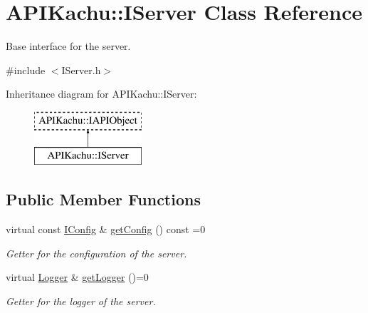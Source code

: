 \hypertarget{class_a_p_i_kachu_1_1_i_server}{}\section{A\+P\+I\+Kachu\+:\+:I\+Server Class Reference}
\label{class_a_p_i_kachu_1_1_i_server}


Base interface for the server.  




{\ttfamily \#include $<$I\+Server.\+h$>$}

Inheritance diagram for A\+P\+I\+Kachu\+:\+:I\+Server\+:\begin{figure}[H]
\begin{center}
\leavevmode
\includegraphics[height=2.000000cm]{class_a_p_i_kachu_1_1_i_server}
\end{center}
\end{figure}
\subsection*{Public Member Functions}
\begin{DoxyCompactItemize}
\item 
virtual const \hyperlink{class_a_p_i_kachu_1_1_i_config}{I\+Config} \& \hyperlink{class_a_p_i_kachu_1_1_i_server_a4a9d8cd045034108f204bf9617103af5}{get\+Config} () const  =0\hypertarget{class_a_p_i_kachu_1_1_i_server_a4a9d8cd045034108f204bf9617103af5}{}\label{class_a_p_i_kachu_1_1_i_server_a4a9d8cd045034108f204bf9617103af5}

\begin{DoxyCompactList}\small\item\em Getter for the configuration of the server. \end{DoxyCompactList}\item 
virtual \hyperlink{class_a_p_i_kachu_1_1_logger}{Logger} \& \hyperlink{class_a_p_i_kachu_1_1_i_server_af7a87851ad77ac1efdacb277ea2bec59}{get\+Logger} ()=0\hypertarget{class_a_p_i_kachu_1_1_i_server_af7a87851ad77ac1efdacb277ea2bec59}{}\label{class_a_p_i_kachu_1_1_i_server_af7a87851ad77ac1efdacb277ea2bec59}

\begin{DoxyCompactList}\small\item\em Getter for the logger of the server. \end{DoxyCompactList}\end{DoxyCompactItemize}


